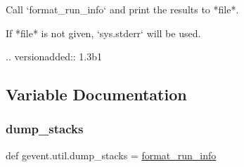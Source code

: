 \begin{DoxyVerb}Call `format_run_info` and print the results to *file*.

If *file* is not given, `sys.stderr` will be used.

.. versionadded:: 1.3b1
\end{DoxyVerb}
 

\subsection{Variable Documentation}
\mbox{\label{namespacegevent_1_1util_aa4740cf4e565f83d9965dd88af403f48}} 
\subsubsection{\texorpdfstring{dump\+\_\+stacks}{dump\_stacks}}
{\footnotesize\ttfamily def gevent.\+util.\+dump\+\_\+stacks = \hyperlink{namespacegevent_1_1util_a090199c0559180f496b56c8352241891}{format\+\_\+run\+\_\+info}}

